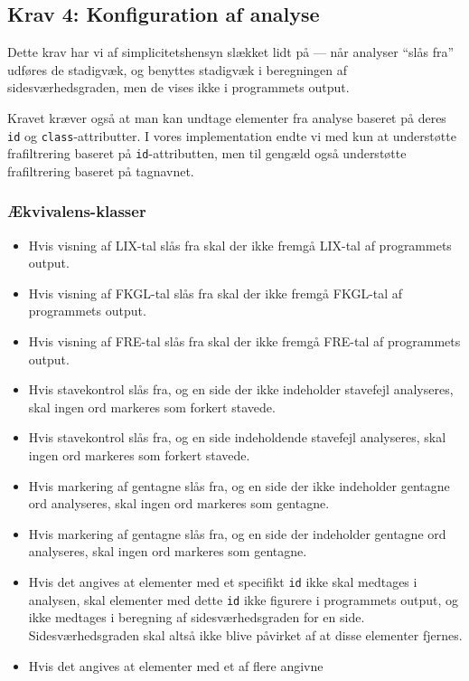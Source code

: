 \documentclass[a4paper,oneside,article]{memoir}
\begin{document}
\begin{landscape}
\section{Krav 4: Konfiguration af analyse}

Dette krav har vi af simplicitetshensyn slækket lidt på --- når
analyser ``slås fra'' udføres de stadigvæk, og benyttes stadigvæk i
beregningen af sidesværhedsgraden, men de vises ikke i programmets
output.

Kravet kræver også at man kan undtage elementer fra analyse baseret på
deres \texttt{id} og \texttt{class}-attributter. I vores
implementation endte vi med kun at understøtte frafiltrering baseret
på \texttt{id}-attributten, men til gengæld også understøtte
frafiltrering baseret på tagnavnet.

\subsubsection{Ækvivalens-klasser}
\begin{itemize}
\item Hvis visning af LIX-tal slås fra skal der ikke fremgå LIX-tal af
  programmets output.
\item Hvis visning af FKGL-tal slås fra skal der ikke fremgå FKGL-tal
  af programmets output.
\item Hvis visning af FRE-tal slås fra skal der ikke fremgå FRE-tal
  af programmets output.
\item Hvis stavekontrol slås fra, og en side der ikke indeholder
  stavefejl analyseres, skal ingen ord markeres som forkert stavede.
\item Hvis stavekontrol slås fra, og en side indeholdende stavefejl
  analyseres, skal ingen ord markeres som forkert stavede.
\item Hvis markering af gentagne slås fra, og en side der ikke
  indeholder gentagne ord analyseres, skal ingen ord markeres som
  gentagne.
\item Hvis markering af gentagne slås fra, og en side der indeholder
  gentagne ord analyseres, skal ingen ord markeres som gentagne.
\item Hvis det angives at elementer med et specifikt \texttt{id} ikke
  skal medtages i analysen, skal elementer med dette \texttt{id} ikke
  figurere i programmets output, og ikke medtages i beregning af
  sidesværhedsgraden for en side. Sidesværhedsgraden skal altså ikke
  blive påvirket af at disse elementer fjernes.
\item Hvis det angives at elementer med et af flere angivne

\end{itemize}
\end{landscape}
\end{document}
